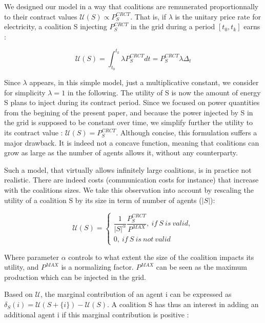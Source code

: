 \documentclass[conference]{IEEEtran}
\begin{document}
We designed our model in a way that coalitions are remunerated proportionnally to their contract values $ \mathcal{U}(S) \propto P_{S}^{CRCT} $. That is, if $ \lambda $ is the unitary price rate for electricity, a coalition S injecting $ P_{S}^{CRCT} $ in the grid during a period $ [t_{0},t_{k}] $ earns :

\begin{equation}
\mathcal{U}(S ) = \int_{t_{0}}^{t_{k}} \lambda P_{S}^{CRCT} dt = P_{S}^{CRCT} \lambda \Delta_{t}
\end{equation} 

Since $ \lambda $ appears, in this simple model, just a multiplicative constant, we consider for simplicity $ \lambda = 1 $ in the following. The utility of S is now the amount of energy S plans to inject during its contract period. Since we focused on power quantities from the begining of the present paper, and because the power injected by S in the grid is supposed to be constant over time, we simplify further the utility to its contract value : $ \mathcal{U}(S) = P_{S}^{CRCT} $. Although concise, this formulation suffers a major drawback. It is indeed not a concave function, meaning that coalitions can grow as large as the number of agents allows it, without any counterparty. 

Such a model, that virtually allows infinitely large coalitions, is in practice not realistic. There are indeed costs (communication costs for instance) that increase with the coalitions sizes. We take this observation into account by rescaling the utility of a coalition S by its size in term of number of agents ($|S|$):

\begin{equation}
\mathcal{U}(S) = \left\{ \begin{array}{lll}
							\dfrac{1}{|S|^{\alpha}} \dfrac{ P_{S}^{CRCT} }{P^{MAX}},\ if\ S\ is\ valid, \\
							0,\ if\ S\ is\ not\ valid
						 \end{array}
				  \right.
\end{equation}

Where parameter $ \alpha $ controls to what extent the size of the coalition impacts its utility, and $ P^{MAX} $ is a normalizing factor. $ P^{MAX} $ can be seen as the maximum production which can be injected in the grid.

Based on $ \mathcal{U} $, the marginal contribution of an agent i can be expressed as $ \delta_{S}(i) = \mathcal{U}(S+\{i\}) - \mathcal{U}(S) $. A coalition S has thus an interest in adding an additional agent i if this marginal contribution is positive : 
\end{document}
